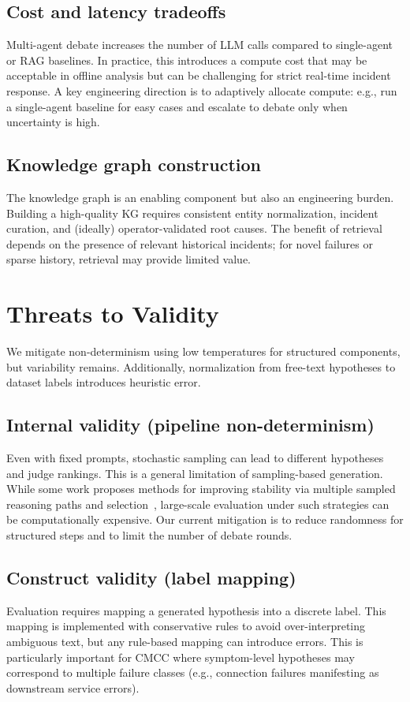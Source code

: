 \subsection{Cost and latency tradeoffs}
Multi-agent debate increases the number of LLM calls compared to single-agent or RAG baselines.
In practice, this introduces a compute cost that may be acceptable in offline analysis but can be
challenging for strict real-time incident response. A key engineering direction is to adaptively
allocate compute: e.g., run a single-agent baseline for easy cases and escalate to debate only
when uncertainty is high.

\subsection{Knowledge graph construction}
The knowledge graph is an enabling component but also an engineering burden. Building a
high-quality KG requires consistent entity normalization, incident curation, and (ideally)
operator-validated root causes. The benefit of retrieval depends on the presence of relevant
historical incidents; for novel failures or sparse history, retrieval may provide limited value.

\section{Threats to Validity}
We mitigate non-determinism using low temperatures for structured components, but variability
remains. Additionally, normalization from free-text hypotheses to dataset labels introduces
heuristic error.

\subsection{Internal validity (pipeline non-determinism)}
Even with fixed prompts, stochastic sampling can lead to different hypotheses and judge rankings.
This is a general limitation of sampling-based generation. While some work proposes methods for
improving stability via multiple sampled reasoning paths and
selection~\cite{wang2023selfconsistencyimproveschainthought}, large-scale evaluation under such
strategies can be computationally expensive. Our current mitigation is to reduce randomness for
structured steps and to limit the number of debate rounds.

\subsection{Construct validity (label mapping)}
Evaluation requires mapping a generated hypothesis into a discrete label. This mapping is
implemented with conservative rules to avoid over-interpreting ambiguous text, but any rule-based
mapping can introduce errors. This is particularly important for CMCC where symptom-level
hypotheses may correspond to multiple failure classes (e.g., connection failures manifesting as
downstream service errors).

